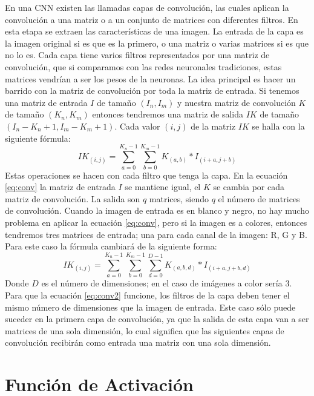 \documentclass[a4paper,12pt]{article}
\begin{document}
En una CNN existen las llamadas capas de convolución, las cuales aplican la convolución a una matriz o a un conjunto de matrices con diferentes
filtros. En esta etapa se extraen las características de una imagen. La entrada de la capa es la imagen original si es que es la
primero, o una matriz o varias matrices si es que no lo es. Cada capa tiene varios filtros representados por una matriz de convolución, que si
comparamos con las redes neuronales tradiciones, estas matrices vendrían a ser los pesos de la neuronas.
La idea principal es hacer un barrido con la matriz de convolución por toda la matriz de entrada. Si tenemos una matriz 
de entrada $I$ de tamaño $(I_{n},I_{m})$ y nuestra matriz de convolución $K$ de tamaño
$(K_{n},K_{m})$ entonces tendremos una matriz de salida $IK$ de tamaño $(I_{n} - K_{n} + 1,I_{m} - K_{m} + 1)$. Cada
valor $(i,j)$ de la matriz $IK$ se halla con la siguiente fórmula:
\begin{equation}\label{eq:conv}
IK_{(i,j)}=\sum_{a=0}^{K_{n}-1}\sum_{b=0}^{K_{m}-1}K_{(a,b)} * I_{(i+a,j+b)} 
\end{equation}
Estas operaciones se hacen con cada filtro que tenga la capa. En la ecuación \ref{eq:conv} la matriz de entrada $I$ se mantiene
igual, el $K$ se cambia por cada matriz de convolución. La salida son $q$ matrices, siendo $q$ el número de matrices de 
convolución. Cuando la imagen de entrada es en blanco y negro, no hay mucho problema en aplicar la ecuación \ref{eq:conv}, 
pero si la imagen es a colores, entonces tendremos tres matrices de entrada; una para cada canal de la imagen: R, G y B.
Para este caso la fórmula cambiará \cite{Stutz} de la siguiente forma:
\begin{equation}\label{eq:conv2}
IK_{(i,j)}=\sum_{a=0}^{K_{n}-1}\sum_{b=0}^{K_{m}-1}\sum_{d=0}^{D-1} K_{(a,b,d)} * I_{(i+a,j+b,d)}
\end{equation}
Donde $D$ es el número de dimensiones; en el caso de imágenes a color sería 3. Para que la ecuación \ref{eq:conv2} funcione,
los filtros de la capa deben tener el mismo número de dimensiones que la imagen de entrada. Este caso sólo puede suceder en
la primera capa de convolución, ya que la salida de esta capa van a ser matrices de una sola dimensión, lo cual significa que
las siguientes capas de convolución recibirán como entrada una matriz con una sola dimensión.

\section{Función de Activación}
\end{document}
